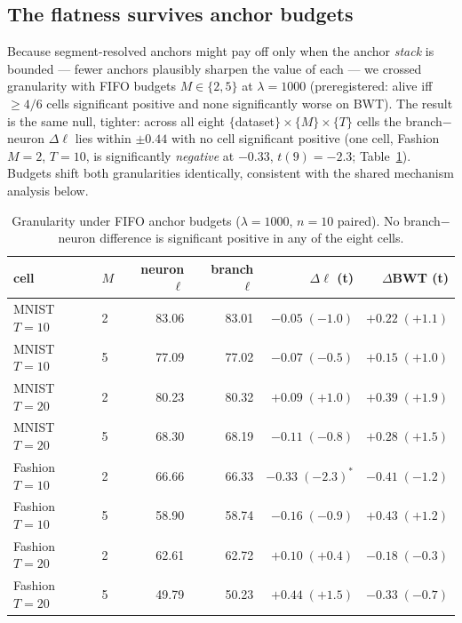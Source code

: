 \documentclass[review,12pt,number]{elsarticle}
\begin{document}
\subsection{The flatness survives anchor budgets}
\label{sec:budget}

Because segment-resolved anchors might pay off only when the anchor
\emph{stack} is bounded --- fewer anchors plausibly sharpen the value of
each --- we crossed granularity with FIFO budgets $M \in \{2, 5\}$ at
$\lambda{=}1000$ (preregistered: alive iff $\ge 4/6$ cells significant
positive and none significantly worse on BWT). The result is the same null,
tighter: across all eight $\{$dataset$\}\times\{M\}\times\{T\}$ cells the
branch$-$neuron $\Delta\ell$ lies within $\pm 0.44$ with no cell significant
positive (one cell, Fashion $M{=}2$, $T{=}10$, is significantly
\emph{negative} at $-0.33$, $t(9){=}-2.3$; Table~\ref{tab:budget}).
Budgets shift both granularities identically, consistent with the shared
mechanism analysis below.

\begin{table}[t]
\centering\small
\caption{Granularity under FIFO anchor budgets ($\lambda{=}1000$, $n{=}10$
paired). No branch$-$neuron difference is significant positive in any of
the eight cells.}
\label{tab:budget}
\begin{tabular}{llrrrr}
\toprule
cell & $M$ & neuron $\ell$ & branch $\ell$ & $\Delta\ell$ (t) & $\Delta$BWT (t) \\
\midrule
MNIST $T{=}10$  & 2 & 83.06 & 83.01 & $-0.05\;(-1.0)$ & $+0.22\;(+1.1)$ \\
MNIST $T{=}10$  & 5 & 77.09 & 77.02 & $-0.07\;(-0.5)$ & $+0.15\;(+1.0)$ \\
MNIST $T{=}20$  & 2 & 80.23 & 80.32 & $+0.09\;(+1.0)$ & $+0.39\;(+1.9)$ \\
MNIST $T{=}20$  & 5 & 68.30 & 68.19 & $-0.11\;(-0.8)$ & $+0.28\;(+1.5)$ \\
Fashion $T{=}10$ & 2 & 66.66 & 66.33 & $-0.33\;(-2.3)^{*}$ & $-0.41\;(-1.2)$ \\
Fashion $T{=}10$ & 5 & 58.90 & 58.74 & $-0.16\;(-0.9)$ & $+0.43\;(+1.2)$ \\
Fashion $T{=}20$ & 2 & 62.61 & 62.72 & $+0.10\;(+0.4)$ & $-0.18\;(-0.3)$ \\
Fashion $T{=}20$ & 5 & 49.79 & 50.23 & $+0.44\;(+1.5)$ & $-0.33\;(-0.7)$ \\
\bottomrule
\end{tabular}
\end{table}
\end{document}
